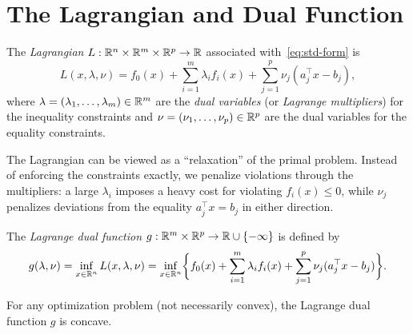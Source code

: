 \documentclass[11pt,a4paper]{article}
\begin{document}
\section{The Lagrangian and Dual Function}\label{sec:lagrangian}

\begin{definition}[Lagrangian]\label{def:lagrangian}
The \emph{Lagrangian} $L : \mathbb{R}^n \times \mathbb{R}^m \times \mathbb{R}^p \to \mathbb{R}$ associated
with~\eqref{eq:std-form} is
\begin{equation}\label{eq:lagrangian}
  L(x, \lambda, \nu) = f_0(x) + \sum_{i=1}^m \lambda_i f_i(x)
    + \sum_{j=1}^p \nu_j (a_j^\top x - b_j),
\end{equation}
where $\lambda = (\lambda_1, \dots, \lambda_m) \in \mathbb{R}^m$ are the
\emph{dual variables} (or \emph{Lagrange multipliers}) for the inequality
constraints and $\nu = (\nu_1, \dots, \nu_p) \in \mathbb{R}^p$ are the dual
variables for the equality constraints.
\end{definition}

\begin{remark}\label{rem:lagrangian-interpretation}
The Lagrangian can be viewed as a ``relaxation'' of the primal problem.
Instead of enforcing the constraints exactly, we penalize violations
through the multipliers: a large $\lambda_i$ imposes a heavy cost for
violating $f_i(x) \le 0$, while $\nu_j$ penalizes deviations from the
equality $a_j^\top x = b_j$ in either direction.
\end{remark}

\begin{definition}\label{def:dual-fn}
The \emph{Lagrange dual function} $g : \mathbb{R}^m \times \mathbb{R}^p \to
\mathbb{R} \cup \{-\infty\}$ is defined by
\begin{equation}\label{eq:dual-fn}
  g(\lambda, \nu) = \inf_{x \in \mathbb{R}^n} L(x, \lambda, \nu)
  = \inf_{x \in \mathbb{R}^n} \biggl\{f_0(x) + \sum_{i=1}^m \lambda_i f_i(x)
    + \sum_{j=1}^p \nu_j (a_j^\top x - b_j) \biggr\}.
\end{equation}
\end{definition}

\begin{proposition}\label{prop:dual-concave}
For any optimization problem (not necessarily convex), the Lagrange dual
function $g$ is concave.
\end{proposition}
\end{document}
